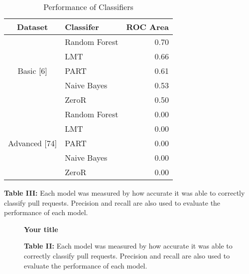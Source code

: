 \documentclass[10pt, conference]{IEEEtran}
\begin{document}
\begin{table}[h!]
  \centering
  \caption{Performance of Classifiers}
  \label{tab:Figure II}
  \begin{tabular}{c|lr}
    \hline
    \textbf {Dataset} & \textbf{Classifer} & \textbf{ROC Area}\\
    \hline
    \multirow{5}{*}{Basic [6]}
    				& \multicolumn{1}{l}{Random Forest} & \multicolumn{1}{r}{0.70} \\\cline{2-3}
                                 & \multicolumn{1}{l}{LMT} & \multicolumn{1}{r}{0.66} \\\cline{2-3}
                                 & \multicolumn{1}{l}{PART} & \multicolumn{1}{r}{0.61} \\\cline{2-3}
                                 & \multicolumn{1}{l}{Naive Bayes} & \multicolumn{1}{r}{0.53} \\\cline{2-3}
                                 & \multicolumn{1}{l}{ZeroR} & \multicolumn{1}{r}{0.50} \\\hline
    \multirow{5}{*}{Advanced [74]} 
    				& \multicolumn{1}{l}{Random Forest} & \multicolumn{1}{r}{0.00} \\\cline{2-3}
                                 & \multicolumn{1}{l}{LMT} & \multicolumn{1}{r}{0.00} \\\cline{2-3}
                                 & \multicolumn{1}{l}{PART} & \multicolumn{1}{r}{0.00} \\\cline{2-3}
                                 & \multicolumn{1}{l}{Naive Bayes} & \multicolumn{1}{r}{0.00} \\\cline{2-3}
                                 & \multicolumn{1}{l}{ZeroR} & \multicolumn{1}{r}{0.00} \\\hline
  \end{tabular}
  \break
  \break
\textbf{Table III:} Each model was measured by how accurate it was able to correctly classify pull requests. Precision and recall are also used to evaluate the performance of each model.
\end{table}

\begin{figure}  
\begin{center}
\textbf{Your title}\par\medskip \break
{}
\newline \small \textbf{Table II:} Each model was measured by how accurate it was able to correctly classify pull requests. Precision and recall are also used to evaluate the performance of each model.
\end{center}
\end{figure}
\end{document}
